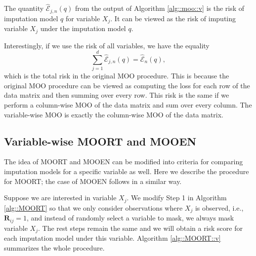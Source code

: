 \documentclass[aos, preprint]{imsart}
\theoremstyle{plain}
\theoremstyle{definition}
\let\hat\widehat
\newcommand{\bR}{\mathbf{R}}
\begin{document}
\begin{appendix}
The quantity $\hat{\mathcal{E}}_{j, n}(q )$ from the output of Algorithm \ref{alg::moo::v}
is the risk of imputation model $q$ for variable $X_j$. 
It can be viewed as the risk of imputing variable $X_j$ under the imputation model $q$.

Interestingly, if we use the risk of all variables, we have the equality
$$
\sum_{j=1}^d\hat{\mathcal{E}}_{j, n}(q ) = \hat{\mathcal{E}}_{n}(q ),
$$
which is the total risk in the original MOO procedure.
This is because the original MOO procedure can be viewed as computing the loss for each row of the data matrix
and then summing over every row. 
This risk is the same if we perform a column-wise MOO of the data matrix and sum over every column. 
The variable-wise MOO is exactly the column-wise MOO of the data matrix.



\subsection{Variable-wise MOORT and MOOEN}	\label{sec::MOORT::v}

The idea of MOORT and MOOEN can be modified into criteria
for comparing imputation models for a specific variable as well.
Here we describe the procedure for MOORT; the case of MOOEN follows in a similar way.

Suppose we are interested in variable $X_j$. 
We modify Step 1 in Algorithm \ref{alg::MOORT} 
so that we only consider observations where $X_j$ is observed, i.e., $\bR_{ij}=1$,
and instead of randomly select a variable to mask, 
we always mask variable $X_{j}$. 
The rest steps remain the same and we will obtain a risk score 
for each imputation model under this variable. 
Algorithm \ref{alg::MOORT::v} summarizes the whole procedure.



\end{appendix}
\end{document}
